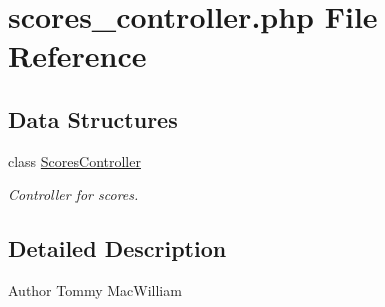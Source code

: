 \hypertarget{scores__controller_8php}{
\section{scores\_\-controller.php File Reference}
\label{scores__controller_8php}
}
\subsection*{Data Structures}
\begin{DoxyCompactItemize}
\item 
class \hyperlink{class_scores_controller}{ScoresController}
\begin{DoxyCompactList}\small\item\em Controller for scores. \item\end{DoxyCompactList}\end{DoxyCompactItemize}


\subsection{Detailed Description}
\begin{DoxyAuthor}{Author}
Tommy MacWilliam 
\end{DoxyAuthor}
